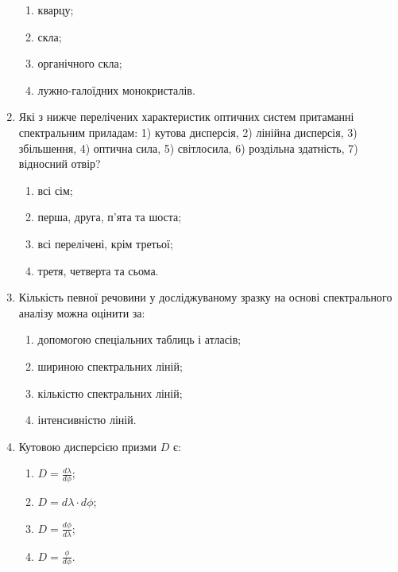 \documentclass[twocolumn]{el-author}
\begin{document}
\begin{enumerate}
	\begin{enumerate}
		\item кварцу;
		\item скла;
		\item органічного скла;
		\item лужно-галоїдних монокристалів.
	\end{enumerate}
	\item Які з нижче перелічених характеристик оптичних систем притаманні
	спектральним приладам: 1) кутова дисперсія, 2) лінійна дисперсія,
3) збільшення, 4) оптична сила, 5) світлосила, 6) роздільна здатність,
7) відносний отвір?
	\begin{enumerate}
		\item всі сім; 
		\item перша, друга, п'ята та шоста;
		\item всі перелічені, крім третьої;
		\item третя, четверта та сьома.
	\end{enumerate}
	\item Кількість певної речовини у досліджуваному зразку на основі
спектрального аналізу можна оцінити за:
	\begin{enumerate}
		\item допомогою спеціальних таблиць і атласів;
		\item шириною спектральних ліній;
		\item кількістю спектральних ліній;
		\item інтенсивністю ліній.
	\end{enumerate}
	\item Кутовою дисперсією призми $D$ є:
	\begin{enumerate}
		\item $D = \frac{d \lambda}{d \phi}$;
		\item $D = d \lambda \cdot d \phi$;
		\item $D = \frac{d \phi}{d \lambda}$;
		\item $D = \frac{\phi}{d \phi}$.
	\end{enumerate}
\end{enumerate}
\end{document}
